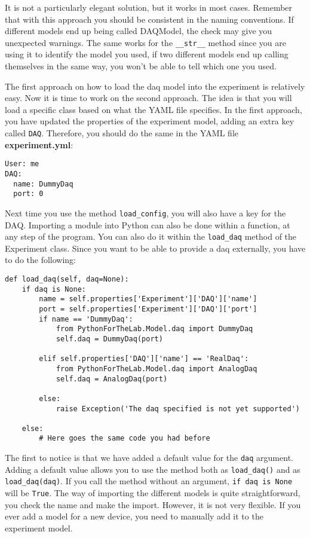 {It is not a particularly elegant solution, but it works in most cases.
Remember that with this approach you should be consistent in the naming
conventions. If different models end up being called DAQModel, the check
may give you unexpected warnings. The same works for the
\texttt{__str__} method since you are using it to identify the
model you used, if two different models end up calling themselves in the
same way, you won't be able to tell which one you used.

The first approach on how to load the daq model into the experiment is
relatively easy. Now it is time to work on the second approach. The idea
is that you will load a specific class based on what the {YAML} file
specifies. In the first approach, you have updated the properties of the
experiment model, adding an extra key called \texttt{DAQ}. Therefore,
you should do the same in the {YAML} file \textbf{experiment.yml}:

\begin{verbatim}
User: me
DAQ:
  name: DummyDaq
  port: 0
\end{verbatim}

Next time you use the method \texttt{load_config}, you will also have a
key for the {DAQ}. Importing a module into Python can also be done
within a function, at any step of the program. You can also do it within
the \texttt{load_daq} method of the Experiment class. Since you want to
be able to provide a daq externally, you have to do the following:

\begin{verbatim}
def load_daq(self, daq=None):
    if daq is None:
        name = self.properties['Experiment']['DAQ']['name']
        port = self.properties['Experiment']['DAQ']['port']
        if name == 'DummyDaq':
            from PythonForTheLab.Model.daq import DummyDaq
            self.daq = DummyDaq(port)
        
        elif self.properties['DAQ']['name'] == 'RealDaq':
            from PythonForTheLab.Model.daq import AnalogDaq
            self.daq = AnalogDaq(port)
        
        else:
            raise Exception('The daq specified is not yet supported')
    
    else:
        # Here goes the same code you had before
\end{verbatim}

The first to notice is that we have added a default value for the
\texttt{daq} argument. Adding a default value allows you to use the
method both as \texttt{load_daq()} and as \texttt{load_daq(daq)}. If
you call the method without an argument, \texttt{if daq is None} will
be \texttt{True}. The way of importing the different models is quite
straightforward, you check the name and make the import. However, it is
not very flexible. If you ever add a model for a new device, you need to
manually add it to the experiment model.

}
